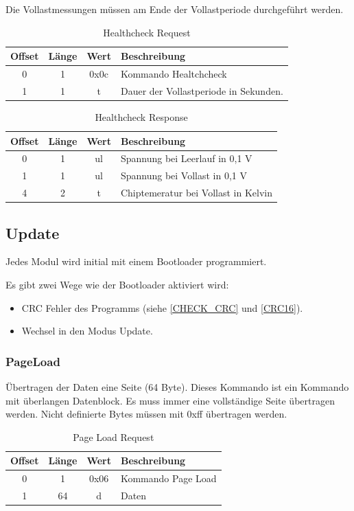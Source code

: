 \documentclass[10pt,a4paper]{article}
\begin{document}
Die Vollastmessungen müssen am Ende der Vollastperiode durchgeführt werden.
\begin{table}[H]
\centering
\begin{tabular}{c|c|c|l}
\textbf{Offset} & \textbf{Länge} & \textbf{Wert} & \textbf{Beschreibung} \\ \hline
0 & 1 & 0x0c & Kommando Healtchcheck \\
1 & 1 & t & Dauer der Vollastperiode in Sekunden.
\end{tabular}
\caption{Healthcheck Request}
\end{table}
\begin{table}[H]
\centering
\begin{tabular}{c|c|c|l}
\textbf{Offset} & \textbf{Länge} & \textbf{Wert} & \textbf{Beschreibung} \\ \hline
0 & 1 & ul & Spannung bei Leerlauf in 0,1 V\\
1 & 1 & ul & Spannung bei Vollast in 0,1 V\\
4 & 2 & t & Chiptemeratur bei Vollast in Kelvin
\end{tabular}
\caption{Healthcheck Response}
\end{table}


\subsection{Update}
Jedes Modul wird initial mit einem Bootloader programmiert.

Es gibt zwei Wege wie der Bootloader aktiviert wird:
\begin{itemize}
 \item CRC Fehler des Programms (siehe \ref{CHECK_CRC} und \ref{CRC16}).
 \item Wechsel in den Modus Update. 
\end{itemize}
  
\subsubsection{PageLoad}
\label{sec:PageLoad}
Übertragen der Daten eine Seite (64 Byte). Dieses Kommando ist ein Kommando mit überlangen Datenblock. Es muss immer eine vollständige Seite übertragen werden. Nicht definierte Bytes müssen mit 0xff übertragen werden.
\begin{table}[H]
\centering
\begin{tabular}{c|c|c|l}
\textbf{Offset} & \textbf{Länge} & \textbf{Wert} & \textbf{Beschreibung} \\ \hline
0 & 1 & 0x06 & Kommando Page Load\\
1 & 64 & d & Daten
\end{tabular}
\caption{Page Load Request}
\end{table}
\end{document}
